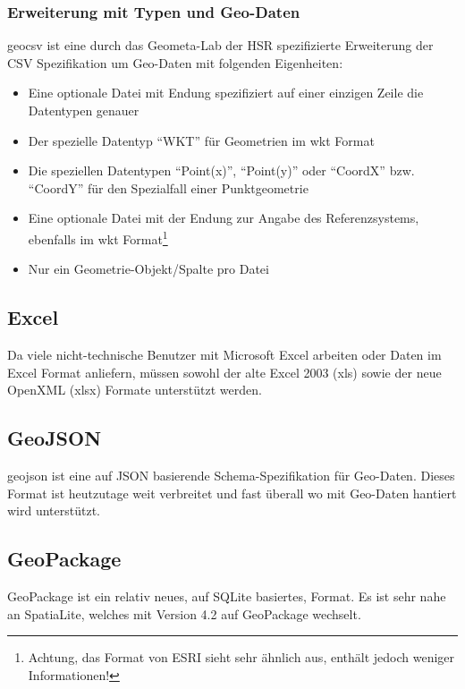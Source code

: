 \subsubsection{Erweiterung mit Typen und Geo-Daten}

\gls{geocsv} ist eine durch das Geometa-Lab der HSR spezifizierte Erweiterung der CSV Spezifikation um Geo-Daten mit folgenden Eigenheiten\cite{sfkeller,geocsv,gdal-csv}:

\begin{itemize}
\item Eine optionale Datei mit Endung  spezifiziert auf einer einzigen Zeile die Datentypen genauer
\item Der spezielle Datentyp ``WKT'' für Geometrien im \gls{wkt} Format
\item Die speziellen Datentypen ``Point(x)'', ``Point(y)'' oder ``CoordX'' bzw. ``CoordY'' für den Spezialfall einer Punktgeometrie
\item Eine optionale Datei mit der Endung  zur Angabe des Referenzsystems, ebenfalls im \gls{wkt} Format\footnote{Achtung, das  Format von ESRI sieht sehr ähnlich aus, enthält jedoch weniger Informationen!}
\item Nur ein Geometrie-Objekt/Spalte pro Datei
\end{itemize}


\subsection{Excel}
Da viele nicht-technische Benutzer mit Microsoft Excel arbeiten\cite{sfkeller} oder Daten im Excel Format anliefern, müssen sowohl der alte Excel 2003 (xls) sowie der neue OpenXML (xlsx) Formate unterstützt werden.

\subsection{GeoJSON}
\gls{geojson} ist eine auf JSON basierende Schema-Spezifikation für Geo-Daten. Dieses Format ist heutzutage weit verbreitet und fast überall wo mit Geo-Daten hantiert wird unterstützt.

\subsection{GeoPackage}
GeoPackage ist ein relativ neues, auf SQLite basiertes, Format. Es ist sehr nahe an SpatiaLite, welches mit Version 4.2 auf GeoPackage wechselt.


